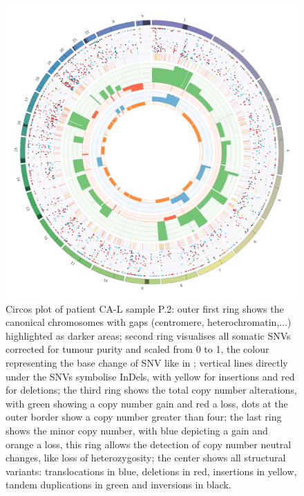 \begin{figure}[htp]
\centering
\includegraphics[width=.99\linewidth]{Figures/CASCADE/CA86/CA86-17B037524-1-A.circos.png}
\caption[Circos plot of patient CA-L sample P.2]{Circos plot of patient CA-L sample P.2: outer first ring shows the canonical chromosomes with gaps (centromere, heterochromatin,...) highlighted as darker areas; second ring visualises all somatic SNVs corrected for tumour purity and scaled from 0 to 1, the colour representing the base change of SNV like in \protect\textcite{Alexandrov2013}; vertical lines directly under the SNVs symbolise InDels, with yellow for insertions and red for deletions; the third ring shows the total copy number alterations, with green showing a copy number gain and red a loss, dots at the outer border show a copy number greater than four; the last ring shows the minor copy number, with blue depicting a gain and orange a loss, this ring allows the detection of copy number neutral changes, like loss of heterozygosity; the center shows all structural variants: translocations in blue, deletions in red, insertions in yellow, tandem duplications in green and inversions in black.} \label{fig:ca86.p2circos}
\end{figure}

